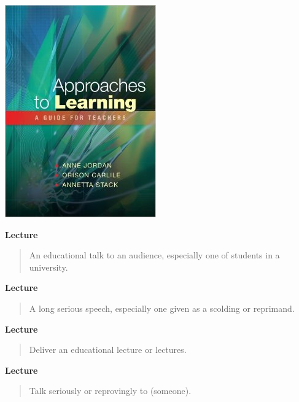 \documentclass{beamer}
\begin{document}
    \begin{frame}
        \begin{center}
            \includegraphics[height=.8\textheight]{../2015-07-22-My-experience-of-pcutl/approaches_to_learning.jpg}
        \end{center}
    \end{frame}

    \begin{frame}
        \textbf{Lecture}

        \begin{quote}
            An educational talk to an audience, especially one of students in a university.
        \end{quote}
    \end{frame}

    \begin{frame}
        \textbf{Lecture}

        \begin{quote}
            A long serious speech, especially one given as a scolding or reprimand.
        \end{quote}
    \end{frame}


    \begin{frame}
        \textbf{Lecture}

        \begin{quote}
           Deliver an educational lecture or lectures.
        \end{quote}
    \end{frame}

    \begin{frame}
        \textbf{Lecture}

        \begin{quote}
            Talk seriously or reprovingly to (someone).
        \end{quote}
    \end{frame}
\end{document}
